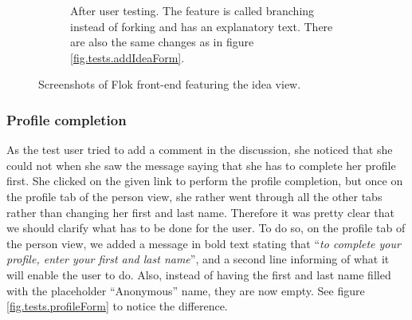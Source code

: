 \documentclass[a4paper,12pt,twoside]{article}
\begin{document}
\begin{figure}[!htb]
\begin{subfigure}[t]{.495\textwidth}
        \caption{After user testing. The feature is called branching instead of forking and has an explanatory text. There are also the same changes as in figure \ref{fig.tests.addIdeaForm}.}
        \label{fig.tests.forkBranchForm.after}
    \end{subfigure}
    \caption{Screenshots of Flok front-end featuring the idea view.}
    \label{fig.tests.forkBranchForm}
\end{figure}

\FloatBarrier
\subsubsection*{Profile completion}
As the test user tried to add a comment in the discussion, she noticed that she could not when she saw the message saying that she has to complete her profile first.
She clicked on the given link to perform the profile completion, but once on the profile tab of the person view, she rather went through all the other tabs rather than changing her first and last name.
Therefore it was pretty clear that we should clarify what has to be done for the user.
To do so, on the profile tab of the person view, we added a message in bold text stating that “\emph{to complete your profile, enter your first and last name}”, and a second line informing of what it will enable the user to do.
Also, instead of having the first and last name filled with the placeholder “Anonymous” name, they are now empty.
See figure \ref{fig.tests.profileForm} to notice the difference.
\end{document}
